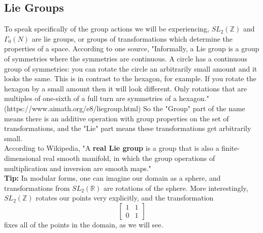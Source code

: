 \documentclass[11pt, oneside]{amsart}
\begin{document}
\subsection{Lie Groups}
To speak specifically of the group actions we will be experiencing, $SL_2(\mathbb{Z})$ and $\Gamma_0(N)$ are lie groups, or groups of transformations which determine the properties of a space. According to one source, "Informally, a Lie group is a group of symmetries where the symmetries are continuous. A circle has a continuous group of symmetries: you can rotate the circle an arbitrarily small amount and it looks the same. This is in contrast to the hexagon, for example. If you rotate the hexagon by a small amount then it will look different. Only rotations that are multiples of one-sixth of a full turn are symmetries of a hexagon." (https://www.aimath.org/e8/liegroup.html) So the "Group" part of the name means there is an additive operation with group properties on the set of transformations, and the "Lie" part means these transformations get arbitrarily small.\\
According to Wikipedia, "A \textbf{real Lie group} is a group that is also a finite-dimensional real smooth manifold, in which the group operations of multiplication and inversion are smooth maps."\\
\textbf{Tip:} In modular forms, one can imagine our domain as a sphere,  and transformations from $SL_2(\mathbb{R})$ are rotations of the sphere. More interestingly, $SL_2(\mathbb{Z})$ rotates our points very explicitly, and the transformation \[\begin{bmatrix}

1 &	1 \\
0 & 1
\end{bmatrix}
\] fixes all of the points in the domain, as we will see.
\end{document}
